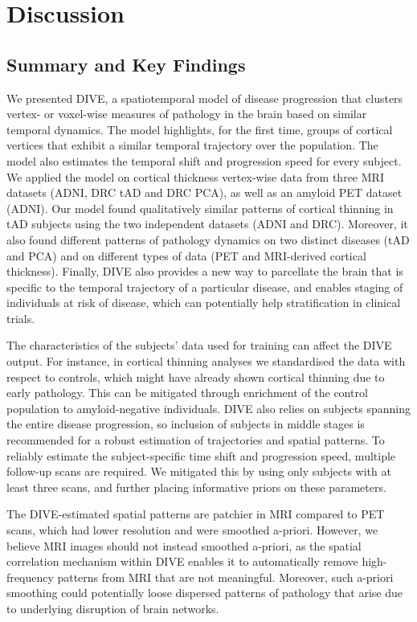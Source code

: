 \section{Discussion}
\label{sec:diveDis}

\subsection{Summary and Key Findings}

We presented DIVE, a spatiotemporal model of disease progression that clusters vertex- or voxel-wise measures of pathology in the brain based on similar temporal dynamics. The model highlights, for the first time, groups of cortical vertices that exhibit a similar temporal trajectory over the population. The model also estimates the temporal shift and progression speed for every subject. We applied the model on cortical thickness vertex-wise data from three MRI datasets (ADNI, DRC tAD and DRC PCA), as well as an amyloid PET dataset (ADNI). Our model found qualitatively similar patterns of cortical thinning in tAD subjects using the two independent datasets (ADNI and DRC). Moreover, it also found different patterns of pathology dynamics on two distinct diseases (tAD and PCA) and on different types of data (PET and MRI-derived cortical thickness). Finally, DIVE also provides a new way to parcellate the brain that is specific to the temporal trajectory of a particular disease, and enables staging of individuals at risk of disease, which can potentially help stratification in clinical trials.

The characteristics of the subjects' data used for training can affect the DIVE output. For instance, in cortical thinning analyses we standardised the data with respect to controls, which might have already shown cortical thinning due to early pathology. This can be mitigated through enrichment of the control population to amyloid-negative individuals. DIVE also relies on subjects spanning the entire disease progression, so inclusion of subjects in middle stages is recommended for a robust estimation of trajectories and spatial patterns. To reliably estimate the subject-specific time shift and progression speed, multiple follow-up scans are required. We mitigated this by using only subjects with at least three scans, and further placing informative priors on these parameters. 

The DIVE-estimated spatial patterns are patchier in MRI compared to PET scans, which had lower resolution and were smoothed a-priori. However, we believe MRI images should not instead smoothed a-priori, as the spatial correlation mechanism within DIVE enables it to automatically remove high-frequency patterns from MRI that are not meaningful.  Moreover, such a-priori smoothing could potentially loose dispersed patterns of pathology that arise due to underlying disruption of brain networks.




